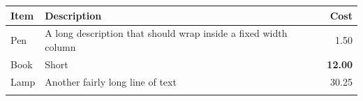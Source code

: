 \begin{center}
  \begin{tabular}{!{\vrule width 0.8pt}l|>{\raggedright\arraybackslash}p{4cm}|r!{\vrule width 0.8pt}}
    \textbf{Item} & \textbf{Description} & \textbf{Cost} \\
    \hline
    Pen & A long description that should wrap inside a fixed width column & 1.50 \\
    \hline
    Book & Short & \textcolor[HTML]{C8361D}{\textbf{12.00}} \\
    \hline
    Lamp & Another fairly long line of text & 30.25 \\
  \end{tabular}
\end{center}
